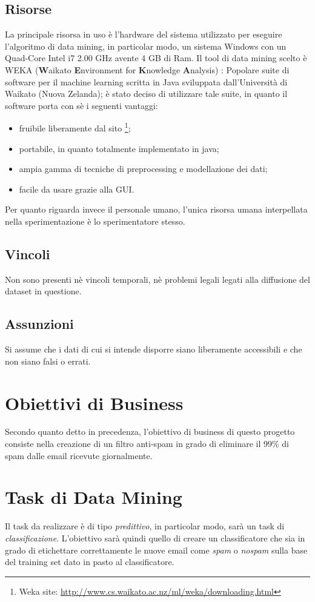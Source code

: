 \subsection{Risorse}
La principale risorsa in uso è l'hardware del sistema utilizzato per eseguire l'algoritmo di data mining, in particolar modo, un sistema Windows con un Quad-Core Intel i7 2.00 GHz avente 4 GB di Ram.
Il tool di data mining scelto è WEKA (\textbf{W}aikato \textbf{E}nvironment for \textbf{K}nowledge \textbf{A}nalysis) \cite{WEKA}:
Popolare suite di software per il machine learning scritta in Java sviluppata dall'Università di Waikato (Nuova Zelanda); è stato deciso di utilizzare tale suite, in quanto il software porta con sè i seguenti vantaggi:
\begin{itemize}
	\item fruibile liberamente dal sito \footnote{Weka site: \url{http://www.cs.waikato.ac.nz/ml/weka/downloading.html}};
    \item portabile, in quanto totalmente implementato in java;
    \item ampia gamma di tecniche di preprocessing e modellazione dei dati;
    \item facile da usare grazie alla GUI.
\end{itemize}
Per quanto riguarda invece il personale umano, l'unica risorsa umana interpellata nella sperimentazione è lo sperimentatore stesso.
\subsection{Vincoli}
	Non sono presenti nè vincoli temporali, nè problemi legali legati alla diffusione del dataset in questione.
\subsection{Assunzioni}
	Si assume che i dati di cui si intende disporre siano liberamente accessibili e che non siano falsi o errati.
\section{Obiettivi di Business}
	Secondo quanto detto in precedenza, l'obiettivo di business di questo progetto consiste nella creazione di un filtro anti-spam in grado di eliminare il 99\% di spam dalle email ricevute giornalmente.
\section{Task di Data Mining}
	\label{task}
	Il task da realizzare è di tipo \textit{predittivo}, in particolar modo, sarà un task di \textit{classificazione}. L'obiettivo sarà quindi quello di creare un classificatore che sia in grado di etichettare correttamente le nuove email come \textit{spam} o \textit{nospam} sulla base del training set dato in pasto al classificatore. 

